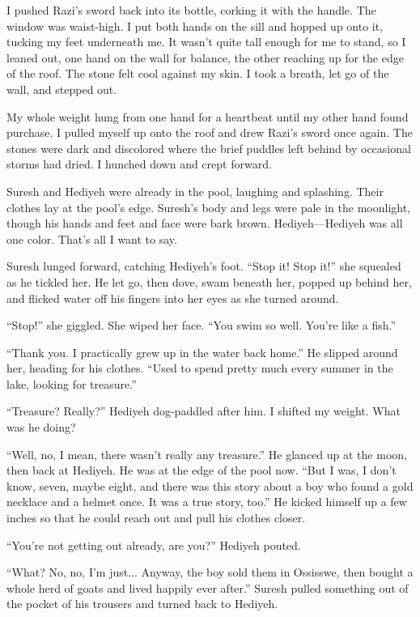 I pushed Razi's sword back into its bottle, corking it with the
handle.  The window was waist-high.  I put both hands on the sill and
hopped up onto it, tucking my feet underneath me.  It wasn't quite
tall enough for me to stand, so I leaned out, one hand on the wall for
balance, the other reaching up for the edge of the roof.  The stone
felt cool against my skin.  I took a breath, let go of the wall, and
stepped out.

My whole weight hung from one hand for a heartbeat until my other hand
found purchase.  I pulled myself up onto the roof and drew Razi's
sword once again.  The stones were dark and discolored where the brief
puddles left behind by occasional storms had dried.  I hunched down
and crept forward.

Suresh and Hediyeh were already in the pool, laughing and splashing.
Their clothes lay at the pool's edge.  Suresh's body and legs were
pale in the moonlight, though his hands and feet and face were bark
brown.  Hediyeh---Hediyeh was all one color.  That's all I want to
say.

Suresh lunged forward, catching Hediyeh's foot.  ``Stop it! Stop it!''
she squealed as he tickled her.  He let go, then dove, swam beneath
her, popped up behind her, and flicked water off his fingers into her
eyes as she turned around.

``Stop!''  she giggled.  She wiped her face.  ``You swim so well.  You're
like a fish.''

``Thank you.  I practically grew up in the water back home.''  He
slipped around her, heading for his clothes.  ``Used to spend pretty
much every summer in the lake, looking for treasure.''

``Treasure?  Really?''  Hediyeh dog-paddled after him.  I shifted my
weight.  What was he doing?

``Well, no, I mean, there wasn't really any treasure.''  He glanced up
at the moon, then back at Hediyeh.  He was at the edge of the pool
now.  ``But I was, I don't know, seven, maybe eight, and there was this
story about a boy who found a gold necklace and a helmet once.  It was
a true story, too.''  He kicked himself up a few inches so that he
could reach out and pull his clothes closer.

``You're not getting out already, are you?''  Hediyeh pouted.

``What?  No, no, I'm just...  Anyway, the boy sold them in Ossisswe,
then bought a whole herd of goats and lived happily ever after.''
Suresh pulled something out of the pocket of his trousers and turned
back to Hediyeh.

